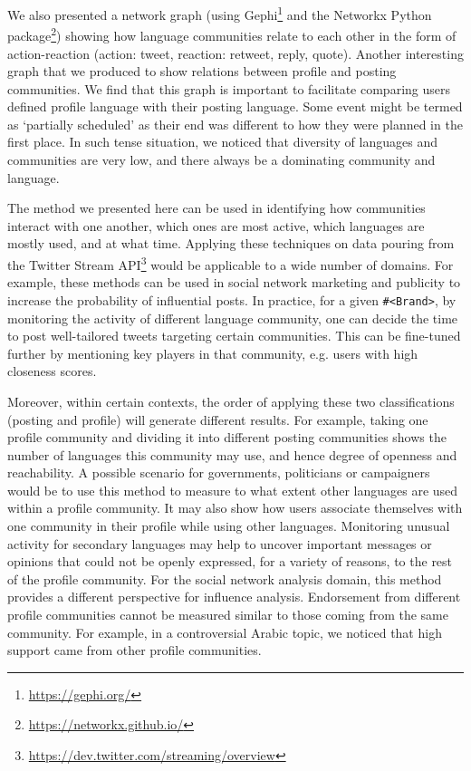 We also presented a network graph (using
Gephi\footnote{\url{https://gephi.org/}} and the Networkx Python
package\footnote{\url{https://networkx.github.io/}}) showing how
language communities relate to each other in the form of
action-reaction (action: tweet, reaction: retweet, reply,
quote). Another interesting graph that we produced to show relations
between profile and posting communities. We find that this graph is
important to facilitate comparing users defined profile language with
their posting language. Some event might be termed as `partially
scheduled' as their end was different to how they were planned in the
first place. In such tense situation, we noticed that diversity of
languages and communities are very low, and there always be a
dominating community and language.

The method we presented here can be used in identifying how
communities interact with one another, which ones are most active,
which languages are mostly used, and at what time. Applying these
techniques on data pouring from the Twitter Stream
API\footnote{\url{https://dev.twitter.com/streaming/overview}} would
be applicable to a wide number of domains. For example, these methods
can be used in social network marketing and publicity to increase the
probability of influential posts. In practice, for a given
{\texttt{\#<Brand>}}, by monitoring the activity of different language
community, one can decide the time to post well-tailored tweets
targeting certain communities. This can be fine-tuned further by
mentioning key players in that community, e.g. users with high
closeness scores.

Moreover, within certain contexts, the order of applying these two
classifications (posting and profile) will generate different results.
For example, taking one profile community and dividing it into
different posting communities shows the number of languages this
community may use, and hence degree of openness and reachability. A
possible scenario for governments, politicians or campaigners would be
to use this method to measure to what extent other languages are used
within a profile community. It may also show how users associate
themselves with one community in their profile while using other
languages. Monitoring unusual activity for secondary languages may
help to uncover important messages or opinions that could not be
openly expressed, for a variety of reasons, to the rest of the profile
community. For the social network analysis domain, this method
provides a different perspective for influence analysis. Endorsement
from different profile communities cannot be measured similar to those
coming from the same community. For example, in a controversial Arabic
topic, we noticed that high support came from other profile
communities.

